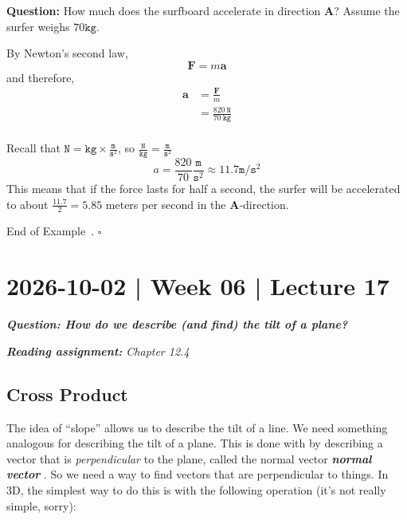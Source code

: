 \documentclass[10pt]{article}
\DeclareRobustCommand{\demph}[1]{%
  \ifmmode
  {\color{Blue}#1}%
  \else
  {\color{Blue}\bfseries\slshape #1}%
  \fi
}
\theoremstyle{definition}
\newtheorem{example}[theorem]{Example}
\renewenvironment{example}
{\begin{oldexample}}
  {\par\smallskip\hfill   End of Example~\theexample. $\square$    \par\end{oldexample}}
\newcommand{\1}[1]{\textbf{1}_{\left[#1\right]}} %
\begin{document}
\begin{example}
  \textbf{Question:} How much does the surfboard accelerate in direction $\mathbf{A}$? Assume the surfer
  weighs $70 \mathtt{kg}$.

  By Newton's second law,
  \begin{equation*}
    \mathbf{F}= m\mathbf{a}
  \end{equation*}
  and therefore,
  \begin{align*}
    \mathbf{a}
    &= \frac{\mathbf{F}}{m}\\
    &= \frac{820\ \mathtt{N}}{70\ \mathtt{kg}}\\
  \end{align*}

  Recall that $\mathtt{N} = \mathtt{kg}\times \frac{\mathtt{m}}{\mathtt{s}^{2}}$, so
  $\frac{\mathtt{N}}{\mathtt{kg}} = \frac{\mathtt{m}}{\mathtt{s}^{2}}$
  \begin{equation*}
    a = \frac{820}{70} \frac{\mathtt{m}}{\mathtt{s}^{2}} \approx 11.7 \mathtt{m}/\mathtt{s}^{2}
  \end{equation*}
  This means that if the force lasts for half a second, the surfer will be accelerated to about
  $\frac{11.7}{2} = 5.85$ meters per second in the $\mathbf{A}$-direction.
  
\end{example}




\newpage
\section{2026-10-02 | Week 06 | Lecture 17}
\begin{center}
  \begin{tcolorbox}[width=0.9\textwidth, colback=white, colframe=black]
    \textit{\textbf{Question: How do we describe (and find) the tilt of a plane?} }

    \textit{\textbf{Reading assignment:} Chapter 12.4}
  \end{tcolorbox}
\end{center}

\subsection{Cross Product}

The idea of ``slope'' allows us to describe the tilt of a line. We need something analogous for
describing the tilt of a plane. This is done with by describing a vector that is \textit{perpendicular}
to the plane, called the \demph{normal vector}. So we need a way to find vectors that are perpendicular
to things. In 3D, the simplest way to do this is with the following operation (it's not really simple,
sorry):
\end{document}
